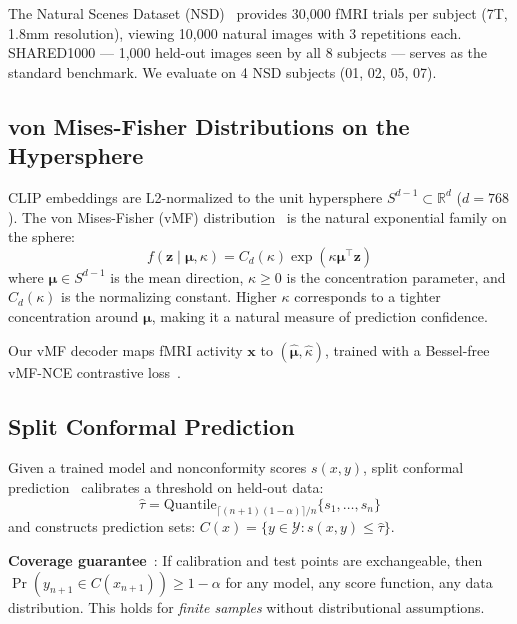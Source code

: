 \documentclass{article}
\newcommand{\R}{\mathbb{R}}
\newcommand{\Sd}{S^{d-1}}
\newcommand{\that}{\hat{\tau}}
\begin{document}
The Natural Scenes Dataset (NSD)~\citep{allen2022massive} provides 30,000 fMRI trials per subject (7T, 1.8mm resolution), viewing 10,000 natural images with 3 repetitions each. SHARED1000 --- 1,000 held-out images seen by all 8 subjects --- serves as the standard benchmark. We evaluate on 4 NSD subjects (01, 02, 05, 07).

\subsection{von Mises-Fisher Distributions on the Hypersphere}

CLIP embeddings are L2-normalized to the unit hypersphere $\Sd \subset \R^d$ ($d=768$). The von Mises-Fisher (vMF) distribution~\citep{banerjee2005clustering} is the natural exponential family on the sphere:
\begin{equation}
    f(\mathbf{z} \mid \boldsymbol{\mu}, \kappa) = C_d(\kappa) \exp(\kappa \boldsymbol{\mu}^\top \mathbf{z})
\end{equation}
where $\boldsymbol{\mu} \in \Sd$ is the mean direction, $\kappa \geq 0$ is the concentration parameter, and $C_d(\kappa)$ is the normalizing constant. Higher $\kappa$ corresponds to a tighter concentration around $\boldsymbol{\mu}$, making it a natural measure of prediction confidence.

Our vMF decoder maps fMRI activity $\mathbf{x}$ to $(\hat{\boldsymbol{\mu}}, \hat{\kappa})$, trained with a Bessel-free vMF-NCE contrastive loss~\citep{davidson2018hyperspherical}.

\subsection{Split Conformal Prediction}

Given a trained model and nonconformity scores $s(x, y)$, split conformal prediction~\citep{papadopoulos2002inductive, lei2018distribution} calibrates a threshold on held-out data:
\begin{equation}
    \that = \text{Quantile}_{\lceil(n+1)(1-\alpha)\rceil / n}\{s_1, \ldots, s_n\}
\end{equation}
and constructs prediction sets: $C(x) = \{y \in \mathcal{Y} : s(x, y) \leq \that\}$.

\textbf{Coverage guarantee}~\citep{vovk2005algorithmic}: If calibration and test points are exchangeable, then $\Pr(y_{n+1} \in C(x_{n+1})) \geq 1 - \alpha$ for any model, any score function, any data distribution. This holds for \emph{finite samples} without distributional assumptions.
\end{document}
